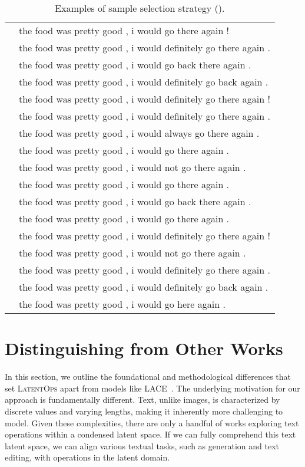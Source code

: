 \documentclass[11pt]{article}
\begin{document}
\begin{table}[ht]
\begin{tabular}{l|l}
&the food was pretty good , i would go there again !\\
&the food was pretty good , i would definitely go there again .\\
&the food was pretty good , i would go back there again .\\
&the food was pretty good , i would definitely go back again .\\
&the food was pretty good , i would definitely go there again !\\
&the food was pretty good , i would definitely go there again .\\
&the food was pretty good , i would always go there again .\\
&the food was pretty good , i would go there again .\\
&the food was pretty good , i would not go there again .\\
&the food was pretty good , i would go there again .\\
&the food was pretty good , i would go back there again .\\
&the food was pretty good , i would go there again .\\
&the food was pretty good , i would definitely go there again !\\
&the food was pretty good , i would not go there again .\\
&the food was pretty good , i would definitely go there again .\\
&the food was pretty good , i would definitely go back again .\\
&the food was pretty good , i would go here again .\\
\bottomrule
    \end{tabular}
    \vspace{-7pt}
    \caption{Examples of sample selection strategy (). 
}
    \label{tab:exmaple_sample_selection}
\end{table}
\clearpage
\section{Distinguishing from Other Works}
\label{app:lace}
In this section, we outline the foundational and methodological differences that set \textsc{LatentOps} apart from models like LACE~\citep{nie2021controllable}.
The underlying motivation for our approach is fundamentally different. Text, unlike images, is characterized by discrete values and varying lengths, making it inherently more challenging to model. Given these complexities, there are only a handful of works exploring text operations within a condensed latent space. If we can fully comprehend this text latent space, we can align various textual tasks, such as generation and text editing, with operations in the latent domain.
\end{document}
